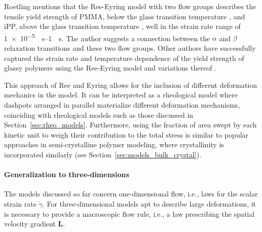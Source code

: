 Roetling mentions that the Ree-Eyring model with two flow groups describes the tensile yield strength of PMMA, below the glass transition temperature \citep{roetlingYieldStressBehaviour1965}, and iPP, above the glass transition temperature \citep{roetlingYieldStressBehaviour1966}, well in the strain rate range of \SIrange{1e-5}{1}{\per\second}.
The author suggests a connection between the $\alpha$ and $\beta$ relaxation transitions and these two flow groups.
Other authors have successfully captured the strain rate and temperature dependence of the yield strength of glassy polymers using the Ree-Eyring model and variations thereof \citep{bauwensTensileYieldstressBehavior1969, bauwensRelationCompressionYield1972, bauwens-crowetCompressionYieldBehaviour1973, haussyThermodynamicAnalysisPlastic1980}.

This approach of Ree and Eyring allows for the inclusion of different deformation mechanics in the model.
It can be interpreted as a rheological model where dashpots arranged in parallel materialize different deformation mechanisms, coinciding with rheological models such as those discussed in Section~\ref{sec:rheo_models}.
Furthermore, using the fraction of area swept by each kinetic unit to weigh their contribution to the total stress is similar to popular approaches in semi-crystalline polymer modeling, where crystallinity is incorporated similarly (see Section~\ref{sec:models_bulk_crystal}).

\paragraph{Generalization to three-dimensions}
The models discussed so far concern one-dimensional flow, i.e., laws for the scalar strain rate $\dot \gamma$.
For three-dimensional models apt to describe large deformations, it is necessary to provide a macroscopic flow rule, i.e., a law prescribing the spatial velocity gradient $\bm L$.


